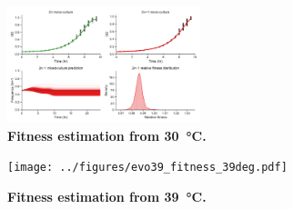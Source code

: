 \documentclass[12pt]{extarticle}
\begin{document}
\begin{figure}[h]
    \centering
	\includegraphics[width=0.5\textwidth]{../figures/evo39_fitness_30deg.pdf}
    \caption{
    \textbf{Fitness estimation from \SI{30}{\celsius}.}
    } 
    \label{fig:growth-curves-30deg}
\end{figure}


\begin{figure}[h]
    \centering
	\texttt{[image: ../figures/evo39\_fitness\_39deg.pdf]}
    \caption{
    \textbf{Fitness estimation from \SI{39}{\celsius}.}
    } 
    \label{fig:growth-curves-39deg}
\end{figure}
\end{document}
